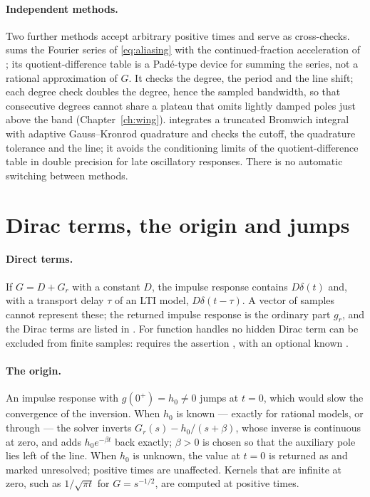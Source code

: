 \paragraph{Independent methods.} Two further methods accept arbitrary
positive times and serve as cross-checks.  sums the
Fourier series of \eqref{eq:aliasing} with the continued-fraction
acceleration of \citet{dehoog1982}; its quotient-difference table is a
Padé-type device for summing the series, not a rational approximation of
$G$. It checks the degree, the period and the line shift; each degree
check doubles the degree, hence the sampled bandwidth, so that consecutive
degrees cannot share a plateau that omits lightly damped poles just above
the band (Chapter~\ref{ch:wing}).
 integrates a truncated Bromwich integral with
adaptive Gauss--Kronrod quadrature and checks the cutoff, the quadrature
tolerance and the line; it avoids the conditioning limits of the
quotient-difference table in double precision for late oscillatory
responses. There is no automatic switching between methods.

\section{Dirac terms, the origin and jumps}

\paragraph{Direct terms.} If $G=D+G_r$ with a constant $D$, the impulse
response contains $D\delta(t)$ and, with a transport delay $\tau$ of an LTI
model, $D\delta(t-\tau)$. A vector of samples cannot represent these; the
returned impulse response is the ordinary part $g_r$, and the Dirac terms
are listed in . For function handles no hidden
Dirac term can be excluded from finite samples:  requires
the assertion , with an optional known
.

\paragraph{The origin.} An impulse response with $g(0^+)=h_0\neq0$ jumps at
$t=0$, which would slow the convergence of the inversion. When $h_0$ is
known --- exactly for rational models, or through  ---
the solver inverts $G_r(s)-h_0/(s+\beta)$, whose inverse is continuous at
zero, and adds $h_0e^{-\beta t}$ back exactly; $\beta>0$ is chosen so that
the auxiliary pole lies left of the line. When $h_0$ is unknown, the value
at $t=0$ is returned as  and marked unresolved; positive times are
unaffected. Kernels that are infinite at zero, such as $1/\sqrt{\pi t}$ for
$G=s^{-1/2}$, are computed at positive times.

